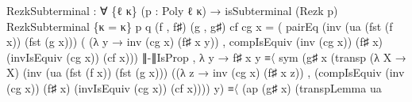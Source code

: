 \documentclass[
  11pt,
  oneside,
  article]{memoir}
\newenvironment{Shaded}{}{}
\newcommand{\NormalTok}[1]{#1}
\newcommand{\OtherTok}[1]{\textcolor[rgb]{0.00,0.44,0.13}{#1}}
\theoremstyle{definition}
\theoremstyle{plain}
\newcommand{\0}{\textsf{0}}
\newcommand{\1}{\tn{\textsf{1}}}
\begin{document}
\begin{Shaded}
\begin{Highlighting}[]
\NormalTok{RezkSubterminal }\OtherTok{:} \OtherTok{∀} \OtherTok{\{}\NormalTok{ℓ κ}\OtherTok{\}} \OtherTok{(}\NormalTok{p }\OtherTok{:}\NormalTok{ Poly ℓ κ}\OtherTok{)} \OtherTok{→}\NormalTok{ isSubterminal }\OtherTok{(}\NormalTok{Rezk p}\OtherTok{)}
\NormalTok{RezkSubterminal }\OtherTok{\{}\NormalTok{κ }\OtherTok{=}\NormalTok{ κ}\OtherTok{\}}\NormalTok{ p q }\OtherTok{(}\NormalTok{f , f♯}\OtherTok{)} \OtherTok{(}\NormalTok{g , g♯}\OtherTok{)}\NormalTok{ cf cg x }\OtherTok{=}
    \OtherTok{(}\NormalTok{ pairEq }\OtherTok{(}\NormalTok{inv }\OtherTok{(}\NormalTok{ua }\OtherTok{(}\NormalTok{fst }\OtherTok{(}\NormalTok{f x}\OtherTok{))} \OtherTok{(}\NormalTok{fst }\OtherTok{(}\NormalTok{g x}\OtherTok{)))} 
                  \OtherTok{(} \OtherTok{(λ}\NormalTok{ y }\OtherTok{→}\NormalTok{ inv }\OtherTok{(}\NormalTok{cg x}\OtherTok{)} \OtherTok{(}\NormalTok{f♯ x y}\OtherTok{))} 
\NormalTok{                  , compIsEquiv }\OtherTok{(}\NormalTok{inv }\OtherTok{(}\NormalTok{cg x}\OtherTok{))} 
                                \OtherTok{(}\NormalTok{f♯ x}\OtherTok{)} 
                                \OtherTok{(}\NormalTok{invIsEquiv }\OtherTok{(}\NormalTok{cg x}\OtherTok{))} 
                                \OtherTok{(}\NormalTok{cf x}\OtherTok{)))}\NormalTok{ ∥{-}∥IsProp }
\NormalTok{    , }\OtherTok{λ}\NormalTok{ y }\OtherTok{→}\NormalTok{ f♯ x y }
\NormalTok{            ≡〈 sym }\OtherTok{(}\NormalTok{g♯ x }\OtherTok{(}\NormalTok{transp }\OtherTok{(λ}\NormalTok{ X }\OtherTok{→}\NormalTok{ X}\OtherTok{)} 
                                  \OtherTok{(}\NormalTok{inv }\OtherTok{(}\NormalTok{ua }\OtherTok{(}\NormalTok{fst }\OtherTok{(}\NormalTok{f x}\OtherTok{))} \OtherTok{(}\NormalTok{fst }\OtherTok{(}\NormalTok{g x}\OtherTok{)))} 
                                       \OtherTok{((λ}\NormalTok{ z }\OtherTok{→}\NormalTok{ inv }\OtherTok{(}\NormalTok{cg x}\OtherTok{)} \OtherTok{(}\NormalTok{f♯ x z}\OtherTok{))}\NormalTok{ , }\OtherTok{(}\NormalTok{compIsEquiv }\OtherTok{(}\NormalTok{inv }\OtherTok{(}\NormalTok{cg x}\OtherTok{))} \OtherTok{(}\NormalTok{f♯ x}\OtherTok{)} 
                                                    \OtherTok{(}\NormalTok{invIsEquiv }\OtherTok{(}\NormalTok{cg x}\OtherTok{))} 
                                                    \OtherTok{(}\NormalTok{cf x}\OtherTok{))))}\NormalTok{ y}\OtherTok{)}
\NormalTok{                    ≡〈 }\OtherTok{(}\NormalTok{ap }\OtherTok{(}\NormalTok{g♯ x}\OtherTok{)} 
                          \OtherTok{(}\NormalTok{transpLemma ua }

\end{Highlighting}
\end{Shaded}
\end{document}

